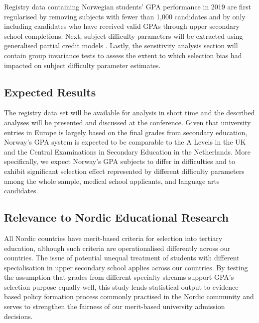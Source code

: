 Registry data containing Norwegian students' GPA performance in 2019 are first regularised by removing subjects with fewer than 1,000 candidates \parencite[as practised by][]{he:2018} and by only including candidates who have received valid GPAs through upper secondary school completions. Next, subject difficulty parameters will be extracted using generalised partial credit models \parencite[GPCM,][]{muraki:1992}. Lastly, the sensitivity analysis section will contain group invariance tests to assess the extent to which selection bias had impacted on subject difficulty parameter estimates.

\subsection{Expected Results}

The registry data set will be available for analysis in short time and the described analyses will be presented and discussed at the conference. Given that university entries in Europe is largely based on the final grades from secondary education, Norway's GPA system is expected to be comparable to the A Levels in the UK and the Central Examinations in Secondary Education in the Netherlands. More specifically, we expect Norway's GPA subjects to differ in difficulties \parencite[per report by][]{he:2018} and to exhibit significant selection effect \parencite[as demonstrated in][]{korobko:2008} represented by different difficulty parameters among the whole sample, medical school applicants, and language arts candidates.

\subsection{Relevance to Nordic Educational Research}

All Nordic countries have merit-based criteria for selection into tertiary education, although such criteria are operationalised differently across our countries. The issue of potential unequal treatment of students with different specialisation in upper secondary school applies across our countries. By testing the assumption that grades from different specialty streams support GPA's selection purpose equally well, this study lends statistical output to evidence-based policy formation process commonly practised in the Nordic community and serves to strengthen the fairness of our merit-based university admission decisions.

\printbibliography